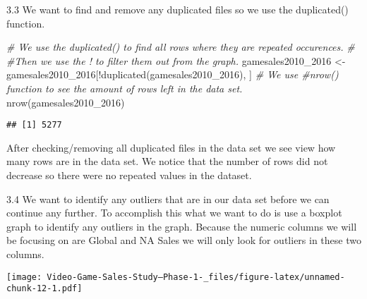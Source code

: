 \documentclass[
]{article}
\newenvironment{Shaded}{\begin{snugshade}}{\end{snugshade}}
\newcommand{\AttributeTok}[1]{\textcolor[rgb]{0.77,0.63,0.00}{#1}}
\newcommand{\CommentTok}[1]{\textcolor[rgb]{0.56,0.35,0.01}{\textit{#1}}}
\newcommand{\FunctionTok}[1]{\textcolor[rgb]{0.00,0.00,0.00}{#1}}
\newcommand{\NormalTok}[1]{#1}
\newcommand{\OtherTok}[1]{\textcolor[rgb]{0.56,0.35,0.01}{#1}}
\newcommand{\SpecialCharTok}[1]{\textcolor[rgb]{0.00,0.00,0.00}{#1}}
\newcommand{\StringTok}[1]{\textcolor[rgb]{0.31,0.60,0.02}{#1}}
\begin{document}
3.3 We want to find and remove any duplicated files so we use the
duplicated() function.

\begin{Shaded}
\begin{Highlighting}[]
\CommentTok{\# We use the duplicated() to find all rows where they are repeated occurences.}
\CommentTok{\# \#Then we use the ! to filter them out from the graph.}
\NormalTok{gamesales2010\_2016 }\OtherTok{\textless{}{-}}\NormalTok{ gamesales2010\_2016[}\SpecialCharTok{!}\FunctionTok{duplicated}\NormalTok{(gamesales2010\_2016), ]}
\CommentTok{\# We use \#nrow() function to see the amount of rows left in the data set.}
\FunctionTok{nrow}\NormalTok{(gamesales2010\_2016)}
\end{Highlighting}
\end{Shaded}

\begin{verbatim}
## [1] 5277
\end{verbatim}

After checking/removing all duplicated files in the data set we see view
how many rows are in the data set. We notice that the number of rows did
not decrease so there were no repeated values in the dataset.

3.4 We want to identify any outliers that are in our data set before we
can continue any further. To accomplish this what we want to do is use a
boxplot graph to identify any outliers in the graph. Because the numeric
columns we will be focusing on are Global and NA Sales we will only look
for outliers in these two columns.

\begin{Shaded}
\end{Shaded}

\texttt{[image: Video-Game-Sales-Study--Phase-1-\_files/figure-latex/unnamed-chunk-12-1.pdf]}

\begin{Shaded}
\end{Shaded}
\end{document}
